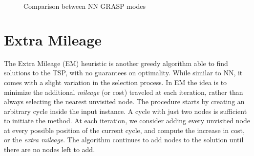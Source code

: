 \begin{figure}[htbp]
	\centering
	\caption{Comparison between NN GRASP modes}
    \label{fig:nnCmp}
\end{figure}


\newpage

\section{Extra Mileage}

The Extra Mileage (EM) heuristic is another greedy algorithm able to find solutions to the TSP, with no guarantees on optimality.
While similar to NN, it comes with a slight variation in the selection process. 
In EM the idea is to minimize the additional \textit{mileage} (or cost) traveled at each iteration, rather than always selecting the nearest unvisited node.
The procedure starts by creating an arbitrary cycle inside the input instance.
A cycle with just two nodes is sufficient to initiate the method.
At each iteration, we consider adding every unvisited node at every possible position of the current cycle, and compute the increase in cost, or the \textit{extra mileage}.
The algorithm continues to add nodes to the solution until there are no nodes left to add.

